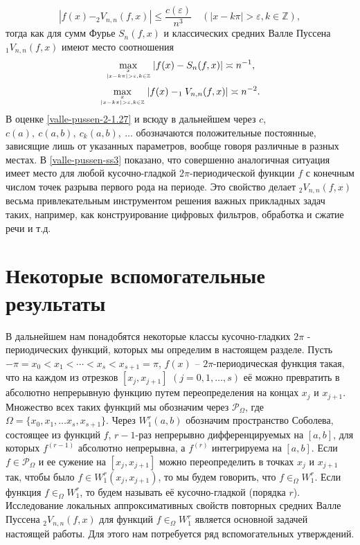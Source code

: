 \begin{equation}\label{valle-pussen-2-1.27}
|f(x)-_2V_{n,n}(f,x)|\le \frac{c(\varepsilon)}{n^3} \quad(|x-k\pi|>\varepsilon, k\in \mathbb{Z}),
 \end{equation}
 тогда как для сумм Фурье $S_n(f,x)$  и классических средних Валле Пуссена $_1V_{n,n}(f,x)$
имеют место соотношения
\begin{equation}\label{valle-pussen-2-1.28}
\max_{x\atop|x-k\pi|>\varepsilon, k\in \mathbb{Z} }|f(x)-S_n(f,x)|\asymp n^{-1},
 \end{equation}
\begin{equation}\label{valle-pussen-2-1.29}
\max_{x\atop|x-k\pi|>\varepsilon, k\in \mathbb{Z} }|f(x)- _1V_{n,n}(f,x)|\asymp n^{-2}.
 \end{equation}
 В оценке \eqref{valle-pussen-2-1.27} и всюду в дальнейшем через $c$, $c(a),\ c(a,b),\ c_k(a,b),\ \ldots$ обозначаются положительные постоянные, зависящие лишь от указанных параметров, вообще говоря различные в  разных местах.
В \ref{valle-pussen-ss3} показано, что совершенно аналогичная ситуация имеет место для любой кусочно-гладкой $2\pi$-периодической функции $f$ с конечным числом точек разрыва первого рода на периоде. Это свойство делает $_2V_{n,n}(f,x)$ весьма привлекательным инструментом решения важных прикладных задач таких, например, как конструирование цифровых фильтров, обработка и сжатие речи и т.д.




\section{Некоторые вспомогательные результаты}\label{valle-pussen-ss2}
В дальнейшем нам понадобятся некоторые классы кусочно-гладких $2\pi$ - периодических функций,
которых мы определим в настоящем разделе. Пусть $-\pi=x_0<x_1<\cdots<x_s<x_{s+1}=\pi$,
$f(x)$ -- $2\pi$-периодическая функция такая, что на каждом из отрезков $[x_j,x_{j+1}]$ $(j=0,1,\ldots,s)$ её можно превратить в абсолютно непрерывную функцию путем переопределения на концах $x_j$ и $x_{j+1}$. Множество всех таких функций мы обозначим  через $\mathcal{ P}_\Omega$, где $\Omega=\{x_0,x_1,\ldots x_s,x_{s+1}\}$.  Через $W_1^r(a,b)$ обозначим пространство Соболева, состоящее из функций $f$, $r-1$-раз непрерывно дифференцируемых на $[a,b]$, для которых $f^{(r-1)}$ абсолютно непрерывна, а $f^{(r)}$ интегрируема на $[a,b]$. Если $f\in \mathcal{ P}_\Omega$ и ее сужение на $[x_j,x_{j+1}]$ можно переопределить в точках
$x_j$ и $x_{j+1}$ так, чтобы было $f\in W_1^r(x_j,x_{j+1})$, то мы будем говорить, что $f\in _\Omega W_1^r$. Если функция $f\in_\Omega W_1^r$, то будем называть её кусочно-гладкой (порядка $r$). Исследование локальных аппроксимативных свойств повторных средних Валле Пуссена $_2V_{n,n}(f,x)$ для функций $f\in_\Omega W_1^r$ является основной задачей настоящей работы. Для этого нам потребуется ряд вспомогательных утверждений.

